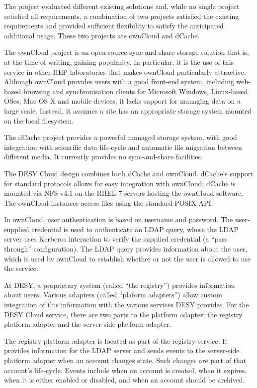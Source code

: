 \documentclass[a4paper]{jpconf}
\begin{document}
The project evaluated different existing solutions and, while no
single project satisfied all requirements, a combination of two
projects satisfied the existing requirements and provided sufficient
flexibility to satisfy the anticipated additional usage.  These two
projects are ownCloud\cite{owncloud-website} and dCache.

The ownCloud project is an open-source sync-and-share storage solution
that is, at the time of writing, gaining popularity.  In particular,
it is the use of this service in other HEP laboratories that makes
ownCloud particularly attractive.  Although ownCloud provides users
with a good front-end system, including web-based browsing and
synchronisation clients for Microsoft Windows, Linux-based OSes, Mac
OS X and mobile devices, it lacks support for managing data on a large
scale.  Instead, it assumes a site has an appropriate storage system
mounted on the local filesystem.

The dCache project provides a powerful managed storage system, with
good integration with scientific data life-cycle and automatic file
migration between different media.  It currently provides no
sync-and-share facilities.

The DESY Cloud design combines both dCache and ownCloud.  dCache's
support for standard protocols allows for easy integration with
ownCloud; dCache is mounted via NFS v4.1\cite{rfc5661} on the RHEL 7
servers hosting the ownCloud software.  The ownCloud instances access
files using the standard POSIX API.

In ownCloud, user authentication is based on username and password.
The user-supplied credential is used to authenticate an LDAP query,
where the LDAP server uses Kerberos interaction to verify the supplied
credential (a ``pass through'' configuration).  The LDAP query
provides information about the user, which is used by ownCloud to
establish whether or not the user is allowed to use the service.

At DESY, a proprietary system (called ``the registry'') provides
information about users.  Various adapters (called ``plaform
adapters'') allow custom integration of this information with the
various services DESY provides.  For the DESY Cloud service, there are
two parts to the platform adapter: the registry platform adapter and
the server-side platform adapter.

The registry platform adapter is located as part of the registry
service.  It provides information for the LDAP server and sends events
to the server-side platform adapter when an account changes state.
Such changes are part of that account's life-cycle.  Events include
when an account is created, when it expires, when it is either enabled
or disabled, and when an account should be archived.
\end{document}
